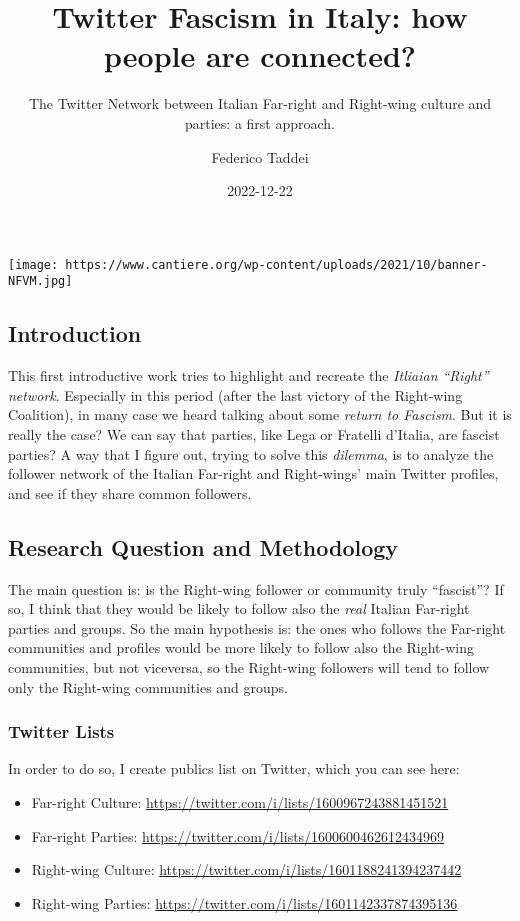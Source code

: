 \documentclass[
]{article}
\title{Twitter Fascism in Italy: how people are connected?}
\subtitle{The Twitter Network between Italian Far-right and Right-wing
culture and parties: a first approach.}
\author{Federico Taddei}
\date{2022-12-22}
\providecommand{\tightlist}{%
  \setlength{\itemsep}{0pt}\setlength{\parskip}{0pt}}
\begin{document}
\maketitle

{
\setcounter{tocdepth}{2}
\tableofcontents
}
\texttt{[image: https://www.cantiere.org/wp-content/uploads/2021/10/banner-NFVM.jpg]}

\hypertarget{introduction}{%
\subsection{Introduction}\label{introduction}}

This first introductive work tries to highlight and recreate the
\emph{Itliaian ``Right'' network}. Especially in this period (after the
last victory of the Right-wing Coalition), in many case we heard talking
about some \emph{return to Fascism}. But it is really the case? We can
say that parties, like Lega or Fratelli d'Italia, are fascist parties? A
way that I figure out, trying to solve this \emph{dilemma}, is to
analyze the follower network of the Italian Far-right and Right-wings'
main Twitter profiles, and see if they share common followers.

\hypertarget{research-question-and-methodology}{%
\subsection{Research Question and
Methodology}\label{research-question-and-methodology}}

The main question is: is the Right-wing follower or community truly
``fascist''? If so, I think that they would be likely to follow also the
\emph{real} Italian Far-right parties and groups. So the main hypothesis
is: the ones who follows the Far-right communities and profiles would be
more likely to follow also the Right-wing communities, but not
viceversa, so the Right-wing followers will tend to follow only the
Right-wing communities and groups.

\hypertarget{twitter-lists}{%
\subsubsection{Twitter Lists}\label{twitter-lists}}

In order to do so, I create publics list on Twitter, which you can see
here:

\begin{itemize}
\tightlist
\item
  Far-right Culture:
  \url{https://twitter.com/i/lists/1600967243881451521}
\item
  Far-right Parties:
  \url{https://twitter.com/i/lists/1600600462612434969}
\item
  Right-wing Culture:
  \url{https://twitter.com/i/lists/1601188241394237442}
\item
  Right-wing Parties:
  \url{https://twitter.com/i/lists/1601142337874395136}
\end{itemize}
\end{document}
